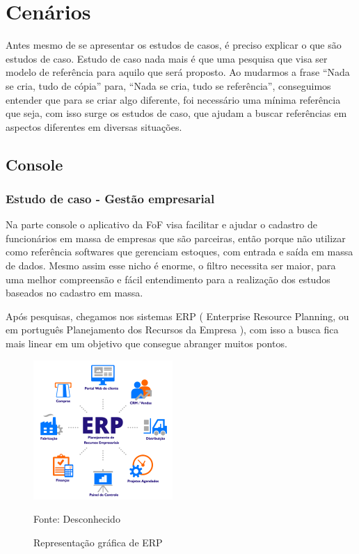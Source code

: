 \section{Cenários}
\vspace*{1cm}
Antes mesmo de se apresentar os estudos de casos, é preciso explicar o que são estudos de caso.
Estudo de caso nada mais é que uma pesquisa que visa ser modelo de referência para aquilo que será proposto. Ao mudarmos a frase “Nada se cria, tudo de cópia” para, “Nada se cria, tudo se referência”, conseguimos entender que para se criar algo diferente, foi necessário uma mínima referência que seja, com isso surge os estudos de caso, que ajudam a buscar referências em aspectos diferentes em diversas situações.

\subsection{Console}


\subsubsection{Estudo de caso - Gestão empresarial}

Na parte console o aplicativo da FoF visa facilitar e ajudar o cadastro de funcionários em massa de empresas que são parceiras, então porque não utilizar como referência softwares que gerenciam estoques, com entrada e saída em massa de dados. Mesmo assim esse nicho é enorme, o filtro necessita ser maior, para uma melhor compreensão e fácil entendimento para a realização dos estudos baseados no cadastro em massa.

Após pesquisas, chegamos nos sistemas ERP ( Enterprise Resource Planning, ou em português Planejamento dos Recursos da Empresa ), com isso a busca fica mais linear em um objetivo que consegue abranger muitos pontos.

\begin{figure}[!h]
	\centering
	\caption{Representação gráfica de ERP}
	\includegraphics[width=200px, height=200px]{./images/erp.png}
	\par{Fonte: Desconhecido}
\end{figure}

